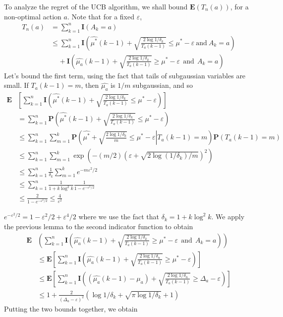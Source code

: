 To analyze the regret of the UCB algorithm, we shall bound $\mathbf{E}(T_n(a))$, for a non-optimal action $a$. Note that for a fixed $\varepsilon$,
%
\begin{align*}
    T_n(a) &= \sum_{k = 1}^n \mathbf{I}(A_k = a)\\
    &\leq \sum_{k = 1}^n \mathbf{I} \left(\widehat{\mu^*}(k-1) + \sqrt{\frac{2 \log 1/\delta_k}{T_a(k-1)}} \leq \mu^* - \varepsilon\ \text{and}\ A_k = a \right)\\
    &\ \ \ \ \ + \mathbf{I} \left(\widehat{\mu_a}(k-1) + \sqrt{\frac{2 \log 1/\delta_k}{T_a(k-1)}} \geq \mu^* - \varepsilon\ \ \text{and}\ \ A_k = a \right)
\end{align*}
%
Let's bound the first term, using the fact that tails of subgaussian variables are small. If $T_a(k-1) = m$, then $\widehat{\mu_a}$ is $1/m$ subgaussian, and so
%
\begin{align*}
    \mathbf{E}& \left[ \sum_{k = 1}^n \mathbf{I} \left(\widehat{\mu^*}(k-1) + \sqrt{\frac{2 \log 1/\delta_k}{T_a(k-1)}} \leq \mu^* - \varepsilon \right) \right]\\
    &= \sum_{k = 1}^n \mathbf{P}\left(\widehat{\mu^*}(k-1) + \sqrt{\frac{2 \log 1/\delta_k}{T_a(k-1)}} \leq \mu^* - \varepsilon \right)\\
    &\leq \sum_{k = 1}^n \sum_{m = 1}^k \mathbf{P}\left( \left. \widehat{\mu^*} + \sqrt{\frac{2 \log 1/\delta_k}{m}} \leq \mu^* - \varepsilon \right| T_a(k-1) = m \right) \mathbf{P}(T_a(k-1) = m)\\
    &\leq \sum_{k = 1}^n \sum_{m = 1}^k \exp\left(-(m/2) \left(\varepsilon + \sqrt{2 \log(1/\delta_k)/m}\right)^2 \right)\\
    &\leq \sum_{k = 1}^n \frac{1}{\delta_k} \sum_{m = 1}^k e^{-m\varepsilon^2/2}\\
    &\leq \sum_{k = 1}^n \frac{1}{1 + k \log^2 k} \frac{1}{1 - e^{- \varepsilon^2/2}}\\
    &\leq \frac{2}{1 - e^{- \varepsilon^2/2}} \leq \frac{4}{\varepsilon^2}
\end{align*}

$e^{-\varepsilon^2/2} = 1 - \varepsilon^2/2 + \varepsilon^4/2$
%
where we use the fact that $\delta_k = 1 + k \log^2 k$. We apply the previous lemma to the second indicator function to obtain
%
\begin{align*}
    \mathbf{E}& \left( \sum_{k = 1}^n \mathbf{I} \left(\widehat{\mu_a}(k-1) + \sqrt{\frac{2 \log 1/\delta_k}{T_a(k-1)}} \geq \mu^* - \varepsilon\ \ \text{and}\ \ A_k = a \right) \right)\\
    &\leq \mathbf{E} \left[ \sum_{k = 1}^n \mathbf{I}(\widehat{\mu_a}(k-1) + \sqrt{\frac{2 \log 1/\delta_n}{T_a(k-1)}} \geq \mu^* - \varepsilon) \right]\\
    &\leq \mathbf{E} \left[ \sum_{k = 1}^n \mathbf{I}((\widehat{\mu_a}(k-1) - \mu_a) + \sqrt{\frac{2 \log 1/\delta_n}{T_a(k-1)}} \geq \Delta_a - \varepsilon) \right]\\
    &\leq 1 + \frac{2}{(\Delta_a - \varepsilon)^2} \left( \log 1/\delta_k + \sqrt{\pi \log 1/\delta_k} + 1 \right)
\end{align*}
%
Putting the two bounds together, we obtain

